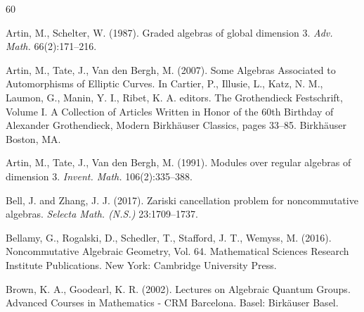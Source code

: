 \documentclass{amsart}
\theoremstyle{definition}
\theoremstyle{remark}
\numberwithin{equation}{section}
\begin{document}
\begin{thebibliography}{60}



 Artin, M., Schelter, W. (1987). Graded algebras of global dimension 3. {\em Adv. Math.} 66(2):171--216. 

 Artin, M., Tate, J., Van den Bergh, M. (2007). Some Algebras Associated to Automorphisms of Elliptic Curves. In Cartier, P., Illusie, L., Katz, N. M., Laumon, G., Manin, Y. I., Ribet, K. A. editors. The Grothendieck Festschrift, Volume I. A Collection of Articles Written in Honor of the 60th Birthday of Alexander Grothendieck, Modern Birkh\"auser Classics, pages 33--85. Birkh\"auser Boston, MA.

 Artin, M., Tate, J., Van den Bergh, M. (1991). Modules over regular algebras of dimension 3. {\em Invent. Math.} 106(2):335--388.


 Bell, J. and Zhang, J. J. (2017). Zariski cancellation problem for noncommutative algebras. {\em Selecta Math. (N.S.)} 23:1709--1737.

 Bellamy, G., Rogalski, D., Schedler, T., Stafford, J. T., Wemyss, M. (2016). Noncommutative Algebraic Geometry, Vol. 64. Mathematical Sciences Research Institute Publications. New York: Cambridge University Press.

 Brown, K. A., Goodearl, K. R. (2002). Lectures on Algebraic Quantum Groups. Advanced Courses in Mathematics - CRM Barcelona. Basel: Birk\"auser Basel.




\end{thebibliography}
\end{document}
